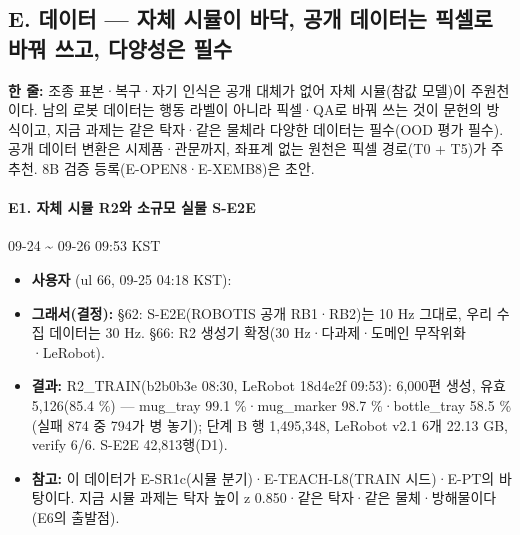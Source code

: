 \subsection{E. 데이터 --- 자체 시뮬이 바닥, 공개 데이터는 픽셀로 바꿔 쓰고, 다양성은 필수}\label{rec:E}
\noindent\textbf{한 줄:} 조종 표본·복구·자기 인식은 공개 대체가 없어 자체 시뮬(참값 모델)이 주원천이다. 남의 로봇 데이터는 행동 라벨이 아니라 픽셀·QA로 바꿔 쓰는 것이 문헌의 방식이고, 지금 과제는 같은 탁자·같은 물체라 다양한 데이터는 필수(OOD 평가 필수). 공개 데이터 변환은 시제품·관문까지, 좌표계 없는 원천은 픽셀 경로(T0 + T5)가 주 추천. 8B 검증 등록(E-OPEN8·E-XEMB8)은 초안.

\paragraph{E1. 자체 시뮬 R2와 소규모 실물 S-E2E}
{\small 09-24 \textasciitilde{} 09-26 09:53 KST}
\begin{itemize}
  \item \textbf{사용자} (ul 66, 09-25 04:18 KST): 
  \item \textbf{그래서(결정):} §62: S-E2E(ROBOTIS 공개 RB1·RB2)는 10 Hz 그대로, 우리 수집 데이터는 30 Hz. §66: R2 생성기 확정(30 Hz·다과제·도메인 무작위화·LeRobot).
  \item \textbf{결과:} R2\_TRAIN(b2b0b3e 08:30, LeRobot 18d4e2f 09:53): 6,000편 생성, 유효 5,126(85.4 \%) --- mug\_tray 99.1 \%·mug\_marker 98.7 \%·bottle\_tray 58.5 \%(실패 874 중 794가 병 놓기); 단계 B 행 1,495,348, LeRobot v2.1 6개 22.13 GB, verify 6/6. S-E2E 42,813행(D1).
  \item \textbf{참고:} 이 데이터가 E-SR1c(시뮬 분기)·E-TEACH-L8(TRAIN 시드)·E-PT의 바탕이다. 지금 시뮬 과제는 탁자 높이 z 0.850·같은 탁자·같은 물체·방해물이다(E6의 출발점).
\end{itemize}

